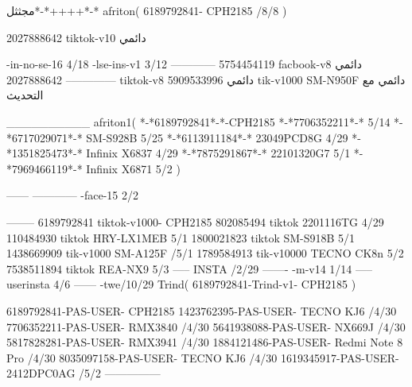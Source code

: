 مجثثل*-*++++*-*
afriton(
6189792841- CPH2185  /8/8
)

2027888642 tiktok-v10
دائمي

-in-no-se-16 4/18
-lse-ins-v1 3/12
------------
5754454119 facbook-v8
دائمي
--------------
2027888642 tiktok-v8
دائمي
5909533996 tik-v1000  SM-N950F
دائمي مع التحديث

__________
afriton1(
*-*6189792841*-*-CPH2185
*-*7706352211*-* 5/14
*-*6717029071*-*  SM-S928B 5/25
*-*6113911184*-* 23049PCD8G 4/29
*-*1351825473*-* Infinix X6837 4/29
*-*7875291867*-* 22101320G7 5/1
*-*7969466119*-* Infinix X6871 5/2
)


------
------------
-face-15 2/2

--------
6189792841 tiktok-v1000- CPH2185 
802085494 tiktok 2201116TG  4/29
110484930 tiktok HRY-LX1MEB  5/1
1800021823 tiktok SM-S918B  5/1
1438669909 tik-v1000 SM-A125F /5/1
1789584913 tik-v10000  TECNO CK8n 5/2
7538511894 tiktok REA-NX9  5/3
-----
 INSTA /2/29
-------
-m-v14 1/14
-----
userinsta 4/6
------
-twe/10/29
Trind(
6189792841-Trind-v1- CPH2185 
)

6189792841-PAS-USER- CPH2185 
1423762395-PAS-USER- TECNO KJ6 /4/30
7706352211-PAS-USER- RMX3840 /4/30
5641938088-PAS-USER- NX669J /4/30
5817828281-PAS-USER- RMX3941 /4/30
1884121486-PAS-USER- Redmi Note 8 Pro /4/30
8035097158-PAS-USER- TECNO KJ6 /4/30
1619345917-PAS-USER- 2412DPC0AG /5/2
    ---------------
